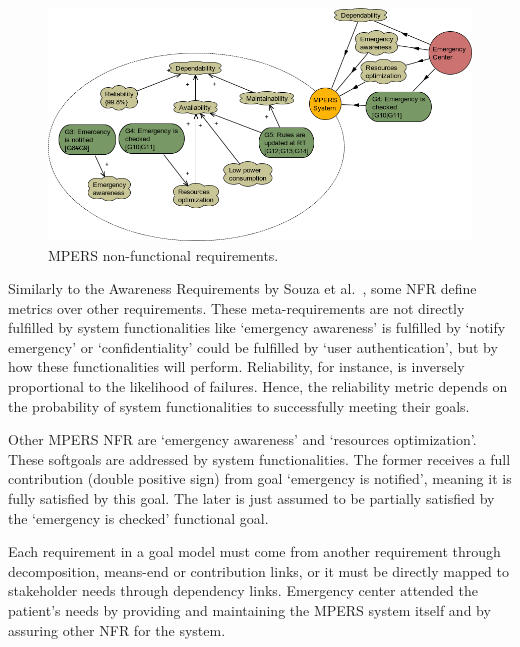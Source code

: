 \begin{figure}[h!]
\centering
\includegraphics[width=1\textwidth]{imgs/MPERS_NFR.png}
\caption{MPERS non-functional requirements.}
\label{fig:MPERS_NFR}
\end{figure}

Similarly to the Awareness Requirements by Souza et al.~\cite{Souza:2011}, some NFR define metrics over other requirements. These meta-requirements are not directly fulfilled by system functionalities like `emergency awareness' is fulfilled by `notify emergency' or `confidentiality' could be fulfilled by `user authentication', but by how these functionalities will perform. Reliability, for instance, is inversely proportional to the likelihood of failures. Hence, the reliability metric depends on the probability of system functionalities to successfully meeting their goals. 

Other MPERS NFR are `emergency awareness' and `resources optimization'. These softgoals are addressed by system functionalities. The former receives a full contribution (double positive sign) from goal `emergency is notified', meaning it is fully satisfied by this goal. The later is just assumed to be partially satisfied by the `emergency is checked' functional goal.





Each requirement in a goal model must come from another requirement through decomposition, means-end or contribution links, or it must be directly mapped to stakeholder needs through dependency links. Emergency center attended the patient's needs by providing and maintaining the MPERS system itself and by assuring other NFR for the system. 

